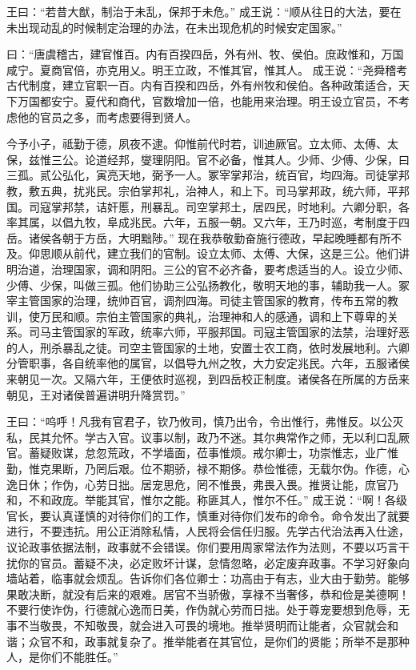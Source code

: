 \documentclass[a4paper,12pt,UTF8,twoside]{ctexbook}
\begin{document}
王曰：“若昔大猷，制治于未乱，保邦于未危。”
成王说：“顺从往日的大法，要在未出现动乱的时候制定治理的办法，在未出现危机的时候安定国家。”

曰：“唐虞稽古，建官惟百。内有百揆四岳，外有州、牧、侯伯。庶政惟和，万国咸宁。夏商官倍，亦克用乂。明王立政，不惟其官，惟其人。
成王说：“尧舜稽考古代制度，建立官职一百。内有百揆和四岳，外有州牧和侯伯。各种政策适合，天下万国都安宁。夏代和商代，官数增加一倍，也能用来治理。明王设立官员，不考虑他的官员之多，而考虑要得到贤人。

今予小子，祗勤于德，夙夜不逮。仰惟前代时若，训迪厥官。立太师、太傅、太保，兹惟三公。论道经邦，燮理阴阳。官不必备，惟其人。少师、少傅、少保，曰三孤。贰公弘化，寅亮天地，弼予一人。冢宰掌邦治，统百官，均四海。司徒掌邦教，敷五典，扰兆民。宗伯掌邦礼，治神人，和上下。司马掌邦政，统六师，平邦国。司寇掌邦禁，诘奸慝，刑暴乱。司空掌邦土，居四民，时地利。六卿分职，各率其属，以倡九牧，阜成兆民。六年，五服一朝。又六年，王乃时巡，考制度于四岳。诸侯各朝于方岳，大明黜陟。”
现在我恭敬勤奋施行德政，早起晚睡都有所不及。仰思顺从前代，建立我们的官制。设立太师、太傅、大保，这是三公。他们讲明治道，治理国家，调和阴阳。三公的官不必齐备，要考虑适当的人。设立少师、少傅、少保，叫做三孤。他们协助三公弘扬教化，敬明天地的事，辅助我一人。冢宰主管国家的治理，统帅百官，调剂四海。司徒主管国家的教育，传布五常的教训，使万民和顺。宗伯主管国家的典礼，治理神和人的感通，调和上下尊卑的关系。司马主管国家的军政，统率六师，平服邦国。司寇主管国家的法禁，治理好恶的人，刑杀暴乱之徒。司空主管国家的土地，安置士农工商，依时发展地利。六卿分管职事，各自统率他的属官，以倡导九州之牧，大力安定兆民。六年，五服诸侯来朝见一次。又隔六年，王便依时巡视，到四岳校正制度。诸侯各在所属的方岳来朝见，王对诸侯普遍讲明升降赏罚。”

王曰：“呜呼！凡我有官君子，钦乃攸司，慎乃出令，令出惟行，弗惟反。以公灭私，民其允怀。学古入官。议事以制，政乃不迷。其尔典常作之师，无以利口乱厥官。蓄疑败谋，怠忽荒政，不学墙面，莅事惟烦。戒尔卿士，功崇惟志，业广惟勤，惟克果断，乃罔后艰。位不期骄，禄不期侈。恭俭惟德，无载尔伪。作德，心逸日休；作伪，心劳日拙。居宠思危，罔不惟畏，弗畏入畏。推贤让能，庶官乃和，不和政庞。举能其官，惟尔之能。称匪其人，惟尔不任。”
成王说：“啊！各级官长，要认真谨慎的对待你们的工作，慎重对待你们发布的命令。命令发出了就要进行，不要违抗。用公正消除私情，人民将会信任归服。先学古代治法再入仕途，议论政事依据法制，政事就不会错误。你们要用周家常法作为法则，不要以巧言干扰你的官员。蓄疑不决，必定败坏计谋，怠情忽略，必定废弃政事。不学习好象向墙站着，临事就会烦乱。告诉你们各位卿士：功高由于有志，业大由于勤劳。能够果敢决断，就没有后来的艰难。居官不当骄傲，享禄不当奢侈，恭和俭是美德啊！不要行使诈伪，行德就心逸而日美，作伪就心劳而日拙。处于尊宠要想到危辱，无事不当敬畏，不知敬畏，就会进入可畏的境地。推举贤明而让能者，众官就会和谐；众官不和，政事就复杂了。推举能者在其官位，是你们的贤能；所举不是那种人，是你们不能胜任。”
\end{document}
